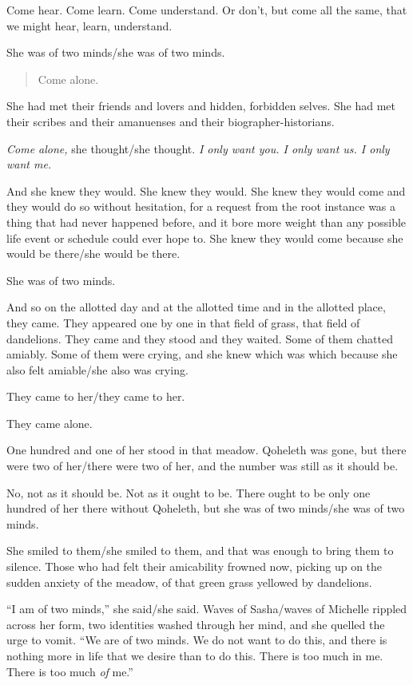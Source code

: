Come hear. Come learn. Come understand. Or don't, but come all the same, that we might hear, learn, understand.

She was of two minds/she was of two minds.

\begin{quote}
Come alone.
\end{quote}

She had met their friends and lovers and hidden, forbidden selves. She had met their scribes and their amanuenses and their biographer-historians.

\emph{Come alone,} she thought/she thought. \emph{I only want you. I only want us. I only want me.}

And she knew they would. She knew they would. She knew they would come and they would do so without hesitation, for a request from the root instance was a thing that had never happened before, and it bore more weight than any possible life event or schedule could ever hope to. She knew they would come because she would be there/she would be there.

She was of two minds.

And so on the allotted day and at the allotted time and in the allotted place, they came. They appeared one by one in that field of grass, that field of dandelions. They came and they stood and they waited. Some of them chatted amiably. Some of them were crying, and she knew which was which because she also felt amiable/she also was crying.

They came to her/they came to her.

They came alone.

One hundred and one of her stood in that meadow. Qoheleth was gone, but there were two of her/there were two of her, and the number was still as it should be.

No, not as it should be. Not as it ought to be. There ought to be only one hundred of her there without Qoheleth, but she was of two minds/she was of two minds.

She smiled to them/she smiled to them, and that was enough to bring them to silence. Those who had felt their amicability frowned now, picking up on the sudden anxiety of the meadow, of that green grass yellowed by dandelions.

``I am of two minds,'' she said/she said. Waves of Sasha/waves of Michelle rippled across her form, two identities washed through her mind, and she quelled the urge to vomit. ``We are of two minds. We do not want to do this, and there is nothing more in life that we desire than to do this. There is too much in me. There is too much \emph{of} me.''

